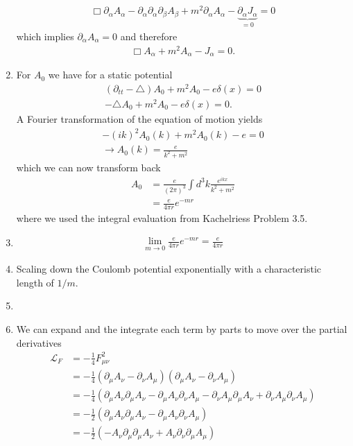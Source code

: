 \documentclass[10pt,a4paper]{book}
\theoremstyle{definition}
\begin{document}
\begin{enumerate}[label=(\alph*)]
\begin{align}
    \Box \partial_\alpha A_\alpha-\partial_\alpha\partial_\alpha\partial_\beta A_\beta+m^2\partial_\alpha A_\alpha-\underbrace{\partial_\alpha J_\alpha}_{=0}=0
\end{align}
which implies $\partial_\alpha A_\alpha=0$ and therefore
\begin{align}
    \Box A_\alpha+m^2A_\alpha-J_\alpha=0.
\end{align}
\item For $A_0$ we have for a static potential
\begin{align}
    (\partial_{tt}-\triangle)A_0+m^2A_0-e\delta(x)=0\\
    -\triangle A_0+m^2A_0-e\delta(x)=0.
\end{align}
A Fourier transformation of the equation of motion yields
\begin{align}
    -(ik)^2 A_0(k)+m^2A_0(k)-e=0\\
    \rightarrow A_0(k)=\frac{e}{k^2+m^2}
\end{align}
which we can now transform back 
\begin{align}
    A_0
    &=\frac{e}{(2\pi)^3}\int d^3k\frac{e^{ikx}}{k^2+m^2}\\
    &=\frac{e}{4\pi r} e^{-mr}
\end{align}
where we used the integral evaluation from {\sc Kachelriess} Problem 3.5.
\item 
\begin{align}
    \lim_{m\rightarrow0}\frac{e}{4\pi r} e^{-mr}=\frac{e}{4\pi r}
\end{align}
\item Scaling down the Coulomb potential exponentially with a characteristic length of $1/m$.
\item
\item We can expand and the integrate each term by parts to move over the partial derivatives 
\begin{align}
    \mathscr{L}_F
    &=-\frac{1}{4}F_{\mu\nu}^2\\
    &=-\frac{1}{4}(\partial_\mu A_\nu-\partial_\nu A_\mu)(\partial_\mu A_\nu-\partial_\nu A_\mu)\\
    &=-\frac{1}{4}\left(\partial_\mu A_\nu \partial_\mu A_\nu-\partial_\mu A_\nu \partial_\nu A_\mu
        -\partial_\nu A_\mu \partial_\mu A_\nu + \partial_\nu A_\mu\partial_\nu A_\mu\right)\\
    &=-\frac{1}{2}\left(\partial_\mu A_\nu \partial_\mu A_\nu-\partial_\mu A_\nu \partial_\nu A_\mu\right)\\
    &=-\frac{1}{2}\left(-A_\nu\partial_\mu\partial_\mu A_\nu+ A_\nu \partial_\nu \partial_\mu A_\mu\right)\\

\end{align}
\end{enumerate}
\end{document}
